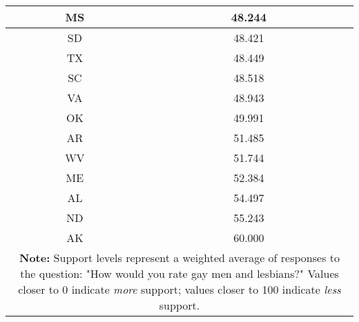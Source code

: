 \begin{longtable}{|c|c|}
\hline
MS & 48.244\\
\hline
SD & 48.421\\
\hline
TX & 48.449\\
\hline
SC & 48.518\\
\hline
VA & 48.943\\
\hline
OK & 49.991\\
\hline
AR & 51.485\\
\hline
WV & 51.744\\
\hline
ME & 52.384\\
\hline
AL & 54.497\\
\hline
ND & 55.243\\
\hline
AK & 60.000\\
\hline
\multicolumn{2}{p{0.8\linewidth}}{\small \textbf{Note:} Support levels represent a weighted average of responses to the question: "How would you rate gay men and lesbians?" Values closer to 0 indicate \textit{more} support; values closer to 100 indicate \textit{less} support.} \\ 
\end{longtable}
